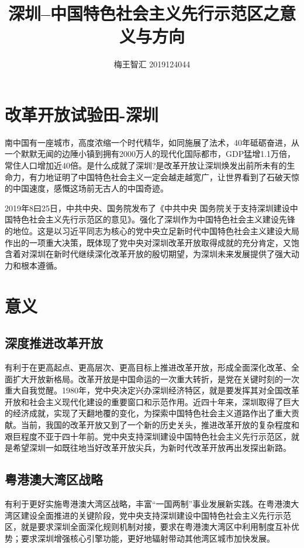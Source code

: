 \documentclass[lang=cn,11pt,a4paper]{elegantpaper}
\title{深圳--中国特色社会主义先行示范区之意义与方向}
\author{梅王智汇 2019124044}
\institute{伍伦贡联合研究院}
\date{}
\begin{document}
\maketitle




\section{改革开放试验田-深圳}
南中国有一座城市，高度浓缩一个时代精华，如同施展了法术，40年砥砺奋进，从一个默默无闻的边陲小镇到拥有2000万人的现代化国际都市，GDP猛增1.1万倍，常住人口增加近40倍。是什么成就了深圳?是改革开放让深圳焕发出前所未有的生命力，有力地证明了中国特色社会主义一定会越走越宽广，让世界看到了石破天惊的中国速度，感慨这场前无古人的中国奇迹。

2019年8曰25日，中共中央、国务院发布了《中共中央 国务院关于支持深圳建设中国特色社会主义先行示范区的意见》。强化了深圳作为中国特色社会主义建设先锋的地位。这是以习近平同志为核心的党中央立足新时代中国特色社会主义建设大局作出的一项重大决策，既体现了党中央对深圳改革开放取得成就的充分肯定，又饱含着对深圳在新时代继续深化改革开放的殷切期望，为深圳未来发展提供了强大动力和根本遵循。

\section{意义}
\subsection{深度推进改革开放}
有利于在更高起点、更高层次、更高目标上推进改革开放，形成全面深化改革、全面扩大开放新格局。改革开放是中国命运的一次重大转折，是党在关键时刻的一次重大自我觉醒。1980年，党中央决定兴办深圳经济特区，就是要发挥其对全国改革开放和社会主义现代化建设的重要窗口和示范作用。近四十年来，深圳取得了巨大的经济成就，实现了天翻地覆的变化，为探索中国特色社会主义道路作出了重大贡献。当前，我国的改革开放又到了一个新的历史关头，推进改革开放的复杂程度和艰巨程度不亚于四十年前。党中央支持深圳建设中国特色社会主义先行示范区，就是希望深圳一如既往地当好改革开放尖兵，为新时代改革开放再出发探出新路。

\subsection{粤港澳大湾区战略}
有利于更好实施粤港澳大湾区战略，丰富“一国两制”事业发展新实践。在粤港澳大湾区建设全面推进的关键阶段，党中央支持深圳建设中国特色社会主义先行示范区，就是要求深圳全面深化规则机制对接，要求在粤港澳大湾区中利用制度互补优势；要求深圳增强核心引擎功能，更好地辐射带动其他湾区城市加快发展。
\end{document}
